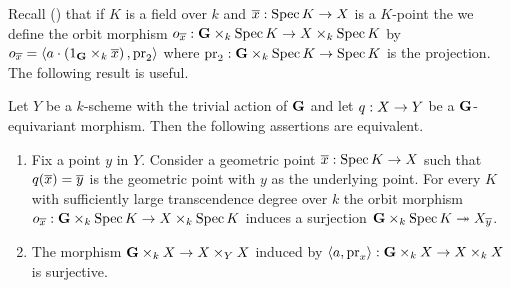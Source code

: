 \noindent
Recall ({\cite[Definition 5.1]{Algebraic_groups}}) that if $K$ is a field over $k$ and $\overline{x}:\mathrm{Spec}\, K\rightarrow X$ is a $K$-point the we define the orbit morphism $o_{\overline{x}}:\mathbf{G}\times_k\mathrm{Spec}\, K\rightarrow X\times_k\mathrm{Spec}\, K$ by $o_{\overline{x}} = \langle a\cdot \left(1_{\mathbf{G}}\times_k\overline{x}\right), \mathrm{pr}_2\rangle$ where $\mathrm{pr}_2:\mathbf{G}\times_k\mathrm{Spec}\, K\rightarrow \mathrm{Spec}\, K$ is the projection. The following result is useful.

\begin{proposition}\label{proposition:fibers_are_geometric_orbits}
Let $Y$ be a $k$-scheme with the trivial action of $\mathbf{G}$ and let $q:X\rightarrow Y$ be a $\mathbf{G}$-equivariant morphism. Then the following assertions are equivalent.
\begin{enumerate}[label=\emph{\textbf{(\roman*)}}, leftmargin=3.0em]
\item Fix a point $y$ in $Y$. Consider a geometric point $\overline{x}:\mathrm{Spec}\, K\rightarrow X$ such that $q(\overline{x}) = \overline{y}$ is the geometric point with $y$ as the underlying point. For every $K$ with sufficiently large transcendence degree over $k$ the orbit morphism $o_{\overline{x}}:\mathbf{G}\times_k\mathrm{Spec}\, K\rightarrow X\times_k\mathrm{Spec}\, K$ induces a surjection $\mathbf{G}\times_k\mathrm{Spec}\, K\twoheadrightarrow X_{\overline{y}}$.
\item The morphism $\mathbf{G}\times_kX\rightarrow X\times_YX$ induced by $\langle a, \mathrm{pr}_x\rangle:\mathbf{G}\times_kX \rightarrow X\times_kX$ is surjective.
\end{enumerate}
\end{proposition}
